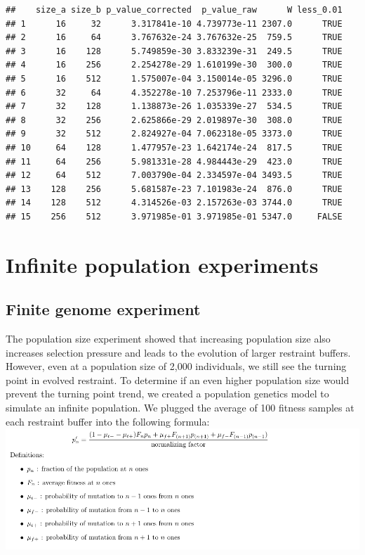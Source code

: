 \documentclass[
]{book}
\begin{document}
\begin{verbatim}
##    size_a size_b p_value_corrected  p_value_raw      W less_0.01
## 1      16     32      3.317841e-10 4.739773e-11 2307.0      TRUE
## 2      16     64      3.767632e-24 3.767632e-25  759.5      TRUE
## 3      16    128      5.749859e-30 3.833239e-31  249.5      TRUE
## 4      16    256      2.254278e-29 1.610199e-30  300.0      TRUE
## 5      16    512      1.575007e-04 3.150014e-05 3296.0      TRUE
## 6      32     64      4.352278e-10 7.253796e-11 2333.0      TRUE
## 7      32    128      1.138873e-26 1.035339e-27  534.5      TRUE
## 8      32    256      2.625866e-29 2.019897e-30  308.0      TRUE
## 9      32    512      2.824927e-04 7.062318e-05 3373.0      TRUE
## 10     64    128      1.477957e-23 1.642174e-24  817.5      TRUE
## 11     64    256      5.981331e-28 4.984443e-29  423.0      TRUE
## 12     64    512      7.003790e-04 2.334597e-04 3493.5      TRUE
## 13    128    256      5.681587e-23 7.101983e-24  876.0      TRUE
## 14    128    512      4.314526e-03 2.157263e-03 3744.0      TRUE
## 15    256    512      3.971985e-01 3.971985e-01 5347.0     FALSE
\end{verbatim}

\hypertarget{infinite-population-experiments}{%
\chapter{Infinite population experiments}\label{infinite-population-experiments}}

\hypertarget{finite-genome-experiment}{%
\section{Finite genome experiment}\label{finite-genome-experiment}}

The population size experiment showed that increasing population size also increases selection pressure and leads to the evolution of larger restraint buffers.
However, even at a population size of 2,000 individuals, we still see the turning point in evolved restraint.
To determine if an even higher population size would prevent the turning point trend, we created a population genetics model to simulate an infinite population.
We plugged the average of 100 fitness samples at each restraint buffer into the following formula:
\includegraphics{./inf_pop/formula.png}
\end{document}
